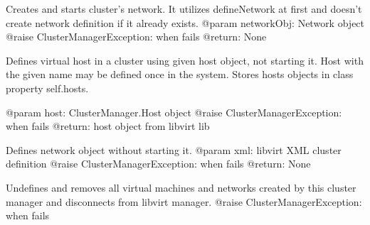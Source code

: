\documentclass[a4paper,11pt,openany]{sphinxmanual}
\begin{document}
\begin{fulllineitems}

\begin{fulllineitems}
\label{ref-manual/XrdTest:XrdTest.ClusterManager.ClusterManager.createNetwork}
Creates and starts cluster's network. It utilizes defineNetwork
at first and doesn't create network definition if it already exists.
@param networkObj: Network object
@raise ClusterManagerException: when fails
@return: None

\end{fulllineitems}


\begin{fulllineitems}
\label{ref-manual/XrdTest:XrdTest.ClusterManager.ClusterManager.defineHost}
Defines virtual host in a cluster using given host object,
not starting it. Host with the given name may be defined once
in the system. Stores hosts objects in class property self.hosts.

@param host: ClusterManager.Host object
@raise ClusterManagerException: when fails
@return: host object from libvirt lib

\end{fulllineitems}


\begin{fulllineitems}
\label{ref-manual/XrdTest:XrdTest.ClusterManager.ClusterManager.defineNetwork}
Defines network object without starting it.
@param xml: libvirt XML cluster definition
@raise ClusterManagerException: when fails
@return: None

\end{fulllineitems}


\begin{fulllineitems}
\label{ref-manual/XrdTest:XrdTest.ClusterManager.ClusterManager.disconnect}
Undefines and removes all virtual machines and networks created
by this cluster manager and disconnects from libvirt manager.
@raise ClusterManagerException: when fails


\end{fulllineitems}
\end{fulllineitems}
\end{document}
